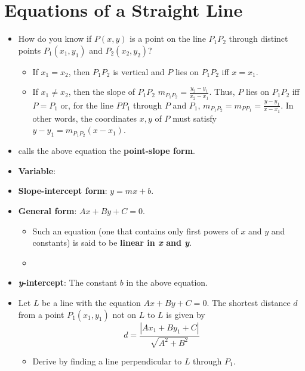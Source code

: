 \documentclass[../main.tex]{subfiles}
\begin{document}
\section{Equations of a Straight Line}
\begin{itemize}
    \item {}How do you know if $P(x,y)$ is a point on the line $P_1P_2$ through distinct points $P_1(x_1,y_1)$ and $P_2(x_2,y_2)$?
    \begin{itemize}
        \item If $x_1=x_2$, then $P_1P_2$ is vertical and $P$ lies on $P_1P_2$ iff $x=x_1$.
        \item If $x_1\neq x_2$, then the slope of $P_1P_2$ $m_{P_1P_2}=\frac{y_2-y_1}{x_2-x_1}$. Thus, $P$ lies on $P_1P_2$ iff $P=P_1$ or, for the line $PP_1$ through $P$ and $P_1$, $m_{P_1P_2}=m_{PP_1}=\frac{y-y_1}{x-x_1}$. In other words, the coordinates $x,y$ of $P$ must satisfy $y-y_1=m_{P_1P_2}(x-x_1)$.
    \end{itemize}
    \item \cite{bib:Thomas} calls the above equation the \textbf{point-slope form}.
    \item \textbf{Variable}: 
    \item \textbf{Slope-intercept form}: $y=mx+b$.
    \item \textbf{General form}: $Ax+By+C=0$.
    \begin{itemize}
        \item Such an equation (one that contains only first powers of $x$ and $y$ and constants) is said to be \textbf{linear in \emph{x} and \emph{y}}.
        \item {}
    \end{itemize}
    \item \textbf{\emph{y}-intercept}: The constant $b$ in the above equation.
    \item Let $L$ be a line with the equation $Ax+By+C=0$. The shortest distance $d$ from a point $P_1(x_1,y_1)$ not on $L$ to $L$ is given by
    \begin{equation*}
        d = \frac{|Ax_1+By_1+C|}{\sqrt{A^2+B^2}}
    \end{equation*}
    \begin{itemize}
        \item Derive by finding a line perpendicular to $L$ through $P_1$.
    \end{itemize}
\end{itemize}
\end{document}

